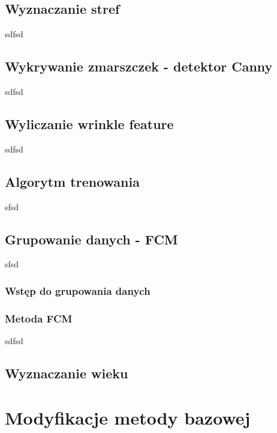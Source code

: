 \documentclass[a4paper,twoside,12pt]{book}
\begin{document}

    \section{Wyznaczanie stref}\label{sec:wyznaczanieStref}
    sdfsd
    \section{Wykrywanie zmarszczek - detektor Canny}\label{sec:wykrywanieZmarszczek}
    sdfsd
    \section{Wyliczanie wrinkle feature}\label{sec:wyliczanieWrinkleFeature}
    sdfsd
    \section{Algorytm trenowania}\label{sec:algorytmTrenowania}
    sfsd
    \section{Grupowanie danych - FCM}\label{sec:grupowanieDanych}
    sfsd
    \subsection{Wstęp do grupowania danych}
    \subsection{Metoda FCM}
    sdfsd
    \section{Wyznaczanie wieku}\label{sec:wyznaczanieWieku}


    \chapter{Modyfikacje metody bazowej}
\end{document}
